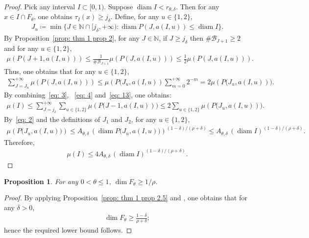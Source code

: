 \documentclass[12pt,reqno]{amsart}
\theoremstyle{definition}
\theoremstyle{plain}
\newtheorem{prop}{Proposition}
\begin{document}
\begin{proof}
Pick any interval $I\subset[0,1)$. Suppose $\operatorname{diam}{I}<r_{\theta,\delta}$. Then for any $x\in I\cap F_{\theta}$, one obtains $\tau_I(x)\geq j_\delta$. Define, for any $u\in\{1,2\}$, 
\begin{align*}
    J_u\coloneqq\min{\{J\in\mathbb{N}\cap[j_\delta,+\infty):\operatorname{diam}{P(J,a(I,u))}\leq \operatorname{diam}{I}\}}.
\end{align*}
By Proposition~\ref{prop: thm 1 prop 2}, for any $J\in\mathbb{N}$, if $J\geq j_\delta$ then $\#\mathcal{B}_{J+1}\geq2$ and for any $u\in\{1,2\}$,
\begin{align*}
    \mu{\left(P(J+1,a(I,u))\right)}
    \leq\frac{1}{\#\mathcal{B}_{J+1}}{\mu{\left(P(J,a(I,u))\right)}}
    \leq\frac{1}{2}\mu{\left(P(J,a(I,u))\right)}
    .
\end{align*}
Thus, one obtains that for any $u\in\{1,2\}$,
\begin{align}
\label{eq: 13}
    \sum_{J=J_u}^{+\infty}\mu{(P(J,a(I,u)))}
    \leq \mu{(P{(J_u,a({I,u})})}\sum_{m=0}^{+\infty}2^{-m}
    =2\mu{(P{(J_u,a({I,u})}))}.
\end{align}
By combining~\eqref{eq: 3}, ~\eqref{eq: 4} and~\eqref{eq: 13}, one obtains:
\begin{align*}
    \mu{(I)}
    \leq\sum_{J=j_\delta}^{+\infty}\sum_{u\in\{1,2\}}\mu{(P{(J-1,a({I,u})}))}
    \leq2\sum_{u\in\{1,2\}}\mu{(P{(J_u,a({I,u})}))}.
\end{align*}
By~\eqref{eq: 2} and the definitions of $J_1$ and $J_2$, for any $u\in\{1,2\}$,
\begin{align*}
    \mu{\left(P{(J_u,a({I,u})})\right)}
    \leq A_{\theta,\delta}\,(\operatorname{diam}{P{(J_u,a({I,u})})})^{(1-\delta)/(\rho+\delta)}
    \leq A_{\theta,\delta}\,(\operatorname{diam}{I})^{(1-\delta)/(\rho+\delta)}.
\end{align*}
Therefore, %
\begin{align*}
    \mu{(I)}
    \leq 4A_{\theta,\delta}\,(\operatorname{diam}{I})^{(1-\delta)/(\rho+\delta)}.
\end{align*}
\end{proof}

\begin{prop}\label{prop: thm 1 prop 3}
    For any $0<\theta\leq1$, $\dim{F_\theta}\geq 1/\rho$.
\end{prop}
\begin{proof}
By applying Proposition~\ref{prop: thm 1 prop 2.5} and \cite[Mass distribution principle~4.2]{Falconer2003FractalGeometry}, one obtains that for any $\delta>0$,
\begin{align*}
    \dim{F_\theta}\geq\frac{1-\delta}{\rho+\delta};
\end{align*}
hence the required lower bound follows.
\end{proof}
\end{document}
